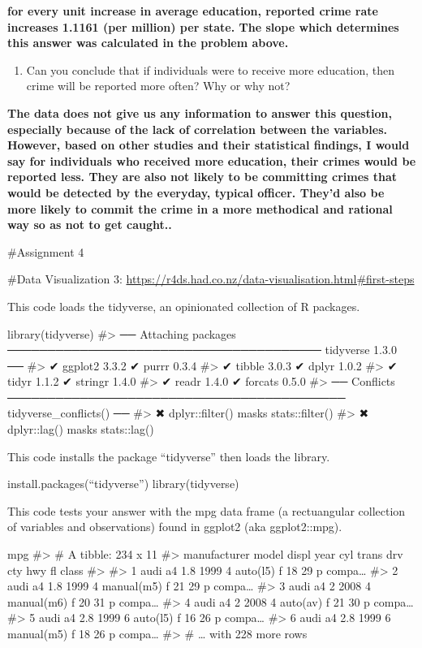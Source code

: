 \documentclass[
]{article}
\providecommand{\tightlist}{%
  \setlength{\itemsep}{0pt}\setlength{\parskip}{0pt}}
\begin{document}
\textbf{for every unit increase in average education, reported crime
rate increases 1.1161 (per million) per state. The slope which
determines this answer was calculated in the problem above.}

\begin{enumerate}
\def\labelenumi{\arabic{enumi}.}
\setcounter{enumi}{6}
\tightlist
\item
  Can you conclude that if individuals were to receive more education,
  then crime will be reported more often? Why or why not?
\end{enumerate}

\textbf{The data does not give us any information to answer this
question, especially because of the lack of correlation between the
variables. However, based on other studies and their statistical
findings, I would say for individuals who received more education, their
crimes would be reported less. They are also not likely to be committing
crimes that would be detected by the everyday, typical officer. They'd
also be more likely to commit the crime in a more methodical and
rational way so as not to get caught..}

\#Assignment 4

\#Data Visualization 3:
\url{https://r4ds.had.co.nz/data-visualisation.html\#first-steps}

This code loads the tidyverse, an opinionated collection of R packages.

library(tidyverse) \#\textgreater{} ── Attaching packages
─────────────────────────────────────── tidyverse 1.3.0 ──
\#\textgreater{} ✔ ggplot2 3.3.2 ✔ purrr 0.3.4 \#\textgreater{} ✔ tibble
3.0.3 ✔ dplyr 1.0.2 \#\textgreater{} ✔ tidyr 1.1.2 ✔ stringr 1.4.0
\#\textgreater{} ✔ readr 1.4.0 ✔ forcats 0.5.0 \#\textgreater{} ──
Conflicts ──────────────────────────────────────────
tidyverse\_conflicts() ── \#\textgreater{} ✖ dplyr::filter() masks
stats::filter() \#\textgreater{} ✖ dplyr::lag() masks stats::lag()

This code installs the package ``tidyverse'' then loads the library.

install.packages(``tidyverse'') library(tidyverse)

This code tests your answer with the mpg data frame (a rectuangular
collection of variables and observations) found in ggplot2 (aka
ggplot2::mpg).

mpg \#\textgreater{} \# A tibble: 234 x 11 \#\textgreater{} manufacturer
model displ year cyl trans drv cty hwy fl class \#\textgreater{}
\#\textgreater{} 1 audi a4 1.8 1999 4 auto(l5) f 18 29 p compa\ldots{}
\#\textgreater{} 2 audi a4 1.8 1999 4 manual(m5) f 21 29 p compa\ldots{}
\#\textgreater{} 3 audi a4 2 2008 4 manual(m6) f 20 31 p compa\ldots{}
\#\textgreater{} 4 audi a4 2 2008 4 auto(av) f 21 30 p compa\ldots{}
\#\textgreater{} 5 audi a4 2.8 1999 6 auto(l5) f 16 26 p compa\ldots{}
\#\textgreater{} 6 audi a4 2.8 1999 6 manual(m5) f 18 26 p compa\ldots{}
\#\textgreater{} \# \ldots{} with 228 more rows
\end{document}
